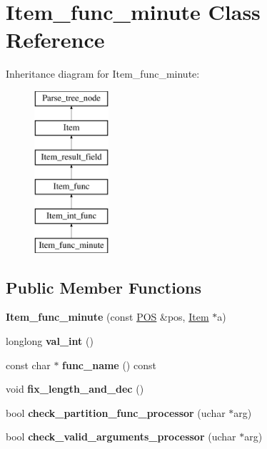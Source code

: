 \hypertarget{classItem__func__minute}{}\section{Item\+\_\+func\+\_\+minute Class Reference}
\label{classItem__func__minute}
Inheritance diagram for Item\+\_\+func\+\_\+minute\+:\begin{figure}[H]
\begin{center}
\leavevmode
\includegraphics[height=6.000000cm]{classItem__func__minute}
\end{center}
\end{figure}
\subsection*{Public Member Functions}
\begin{DoxyCompactItemize}
\item 
\mbox{\label{classItem__func__minute_a73c08fea0b189615441ee4677396e6cd}} 
{\bfseries Item\+\_\+func\+\_\+minute} (const \mbox{\hyperlink{structYYLTYPE}{P\+OS}} \&pos, \mbox{\hyperlink{classItem}{Item}} $\ast$a)
\item 
\mbox{\label{classItem__func__minute_a4a3f1663ad6ab00e986d823ca8758c91}} 
longlong {\bfseries val\+\_\+int} ()
\item 
\mbox{\label{classItem__func__minute_a8a003baa86f7f68c62db76bff5e2e648}} 
const char $\ast$ {\bfseries func\+\_\+name} () const
\item 
\mbox{\label{classItem__func__minute_ae356c4d167b146371a311859026134e4}} 
void {\bfseries fix\+\_\+length\+\_\+and\+\_\+dec} ()
\item 
\mbox{\label{classItem__func__minute_ae0527f016394150a585267eca6c85f6d}} 
bool {\bfseries check\+\_\+partition\+\_\+func\+\_\+processor} (uchar $\ast$arg)
\item 
\mbox{\label{classItem__func__minute_a25b60929f10c3cb8e844e870c31f0ca4}} 
bool {\bfseries check\+\_\+valid\+\_\+arguments\+\_\+processor} (uchar $\ast$arg)
\end{DoxyCompactItemize}
